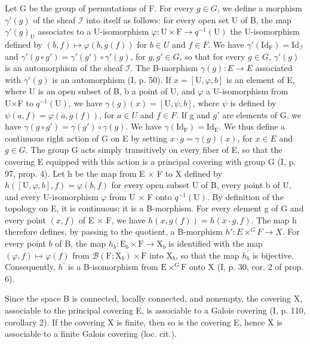 Let G be the group of permutations of F. For every \(g \in G\), we define a morphism \(\gamma'(g)\) of the sheaf \(\mathcal{I}\) into itself as follows: for every open set U of B, the map \(\gamma'(g)_{\mathrm{U}}\) associates to a U-isomorphism \(\varphi: \mathrm{U} \times \mathrm{F} \to q^{-1}(\mathrm{U})\) the U-isomorphism defined by \((b, f) \mapsto \varphi(b, g(f))\) for \(b \in U\) and \(f \in F\). We have \(\gamma'(\mathrm{Id}_{\mathrm{F}}) = \mathrm{Id}_{\mathcal{I}}\) and \(\gamma'(g \circ g') = \gamma'(g') \circ \gamma'(g)\), for \(g, g' \in G\), so that for every \(g \in G\), \(\gamma'(g)\) is an automorphism of the sheaf \(\mathcal{I}\). The B-morphism \(\gamma(g): E \to E\) associated with \(\gamma'(g)\) is an automorphism (I, p. 50). If \(x = [\mathrm{U}, \varphi, b]\) is an element of E, where U is an open subset of B, b a point of U, and \(\varphi\) a U-isomorphism from U×F to \(q^{-1}(\mathrm{U})\), we have \(\gamma(g)(x) = [\mathrm{U}, \psi, b]\), where \(\psi\) is defined by \(\psi(a, f) = \varphi(a, g(f))\), for \(a \in U\) and \(f \in F\). If g and \(g'\) are elements of G, we have \(\gamma(g \circ g') = \gamma(g') \circ \gamma(g)\). We have \(\gamma(\mathrm{Id}_{\mathrm{F}}) = \mathrm{Id}_{\mathrm{E}}\). We thus define a continuous right action of G on E by setting \(x \cdot g = \gamma(g)(x)\), for \(x \in E\) and \(g \in G\). The group G acts simply transitively on every fiber of E, so that the covering E equipped with this action is a principal covering with group G (I, p. 97, prop. 4). Let h be the map from E × F to X defined by \(h([\mathrm{U}, \varphi, b], f) = \varphi(b, f)\) for every open subset U of B, every point b of U, and every U-isomorphism \(\varphi\) from U × F onto \(q^{-1}(\mathrm{U})\). By definition of the topology on E, it is continuous; it is a B-morphism. For every element g of G and every point \((x, f)\) of E × F, we have \(h(x, g(f)) = h(x \cdot g, f)\). The map h therefore defines, by passing to the quotient, a B-morphism \(h': E \times^{G} F \to X\). For every point \(b\) of B, the map \(h_b\colon \mathrm{E}_b\times \mathrm{F}\to \mathrm{X}_b\) is identified with the map \((\varphi, f)\mapsto \varphi(f)\) from \(\mathcal{B}(\mathrm{F};\mathrm{X}_b)\times \mathrm{F}\) into \(\mathrm{X}_b\), so that the map \(h_b^\prime\) is bijective. Consequently, \(h^\prime\) is a B-isomorphism from \(\mathrm{E}\times^{\mathrm{G}}\mathrm{F}\) onto X (I, p. 30, cor. 2 of prop. 6).

Since the space B is connected, locally connected, and nonempty, the covering X, associable to the principal covering E, is associable to a Galois covering (I, p. 110, corollary 2). If the covering X is finite, then so is the covering E, hence X is associable to a finite Galois covering (loc. cit.).

